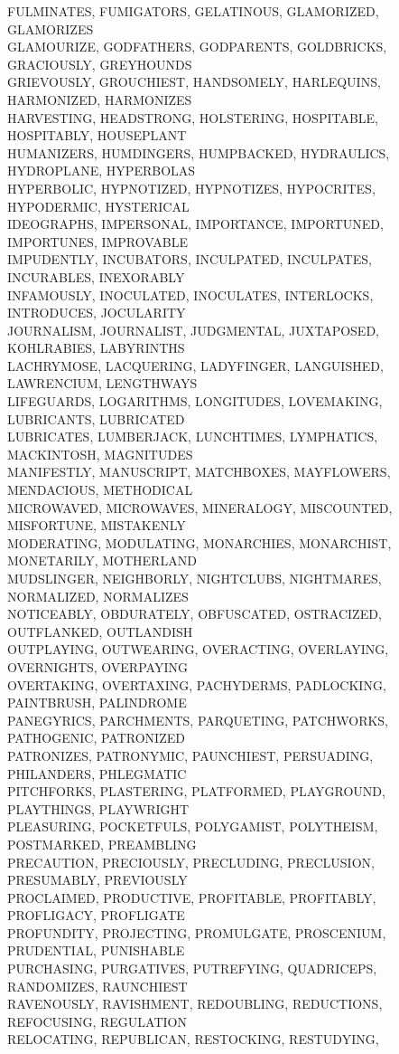 FULMINATES, FUMIGATORS, GELATINOUS, GLAMORIZED, GLAMORIZES\\GLAMOURIZE, GODFATHERS, GODPARENTS, GOLDBRICKS, GRACIOUSLY, GREYHOUNDS\\GRIEVOUSLY, GROUCHIEST, HANDSOMELY, HARLEQUINS, HARMONIZED, HARMONIZES\\HARVESTING, HEADSTRONG, HOLSTERING, HOSPITABLE, HOSPITABLY, HOUSEPLANT\\HUMANIZERS, HUMDINGERS, HUMPBACKED, HYDRAULICS, HYDROPLANE, HYPERBOLAS\\HYPERBOLIC, HYPNOTIZED, HYPNOTIZES, HYPOCRITES, HYPODERMIC, HYSTERICAL\\IDEOGRAPHS, IMPERSONAL, IMPORTANCE, IMPORTUNED, IMPORTUNES, IMPROVABLE\\IMPUDENTLY, INCUBATORS, INCULPATED, INCULPATES, INCURABLES, INEXORABLY\\INFAMOUSLY, INOCULATED, INOCULATES, INTERLOCKS, INTRODUCES, JOCULARITY\\JOURNALISM, JOURNALIST, JUDGMENTAL, JUXTAPOSED, KOHLRABIES, LABYRINTHS\\LACHRYMOSE, LACQUERING, LADYFINGER, LANGUISHED, LAWRENCIUM, LENGTHWAYS\\LIFEGUARDS, LOGARITHMS, LONGITUDES, LOVEMAKING, LUBRICANTS, LUBRICATED\\LUBRICATES, LUMBERJACK, LUNCHTIMES, LYMPHATICS, MACKINTOSH, MAGNITUDES\\MANIFESTLY, MANUSCRIPT, MATCHBOXES, MAYFLOWERS, MENDACIOUS, METHODICAL\\MICROWAVED, MICROWAVES, MINERALOGY, MISCOUNTED, MISFORTUNE, MISTAKENLY\\MODERATING, MODULATING, MONARCHIES, MONARCHIST, MONETARILY, MOTHERLAND\\MUDSLINGER, NEIGHBORLY, NIGHTCLUBS, NIGHTMARES, NORMALIZED, NORMALIZES\\NOTICEABLY, OBDURATELY, OBFUSCATED, OSTRACIZED, OUTFLANKED, OUTLANDISH\\OUTPLAYING, OUTWEARING, OVERACTING, OVERLAYING, OVERNIGHTS, OVERPAYING\\OVERTAKING, OVERTAXING, PACHYDERMS, PADLOCKING, PAINTBRUSH, PALINDROME\\PANEGYRICS, PARCHMENTS, PARQUETING, PATCHWORKS, PATHOGENIC, PATRONIZED\\PATRONIZES, PATRONYMIC, PAUNCHIEST, PERSUADING, PHILANDERS, PHLEGMATIC\\PITCHFORKS, PLASTERING, PLATFORMED, PLAYGROUND, PLAYTHINGS, PLAYWRIGHT\\PLEASURING, POCKETFULS, POLYGAMIST, POLYTHEISM, POSTMARKED, PREAMBLING\\PRECAUTION, PRECIOUSLY, PRECLUDING, PRECLUSION, PRESUMABLY, PREVIOUSLY\\PROCLAIMED, PRODUCTIVE, PROFITABLE, PROFITABLY, PROFLIGACY, PROFLIGATE\\PROFUNDITY, PROJECTING, PROMULGATE, PROSCENIUM, PRUDENTIAL, PUNISHABLE\\PURCHASING, PURGATIVES, PUTREFYING, QUADRICEPS, RANDOMIZES, RAUNCHIEST\\RAVENOUSLY, RAVISHMENT, REDOUBLING, REDUCTIONS, REFOCUSING, REGULATION\\RELOCATING, REPUBLICAN, RESTOCKING, RESTUDYING, 